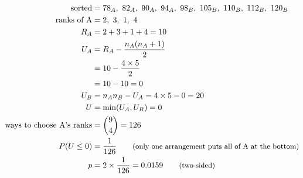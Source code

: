 \begin{align*}
\text{sorted} &= 78_{A},\ 82_{A},\ 90_{A},\ 94_{A},\ 98_{B},\ 105_{B},\ 110_{B},\ 112_{B},\ 120_{B} \\
\text{ranks of A} &= 2,\ 3,\ 1,\ 4 \\
R_A &= 2 + 3 + 1 + 4 = 10 \\
U_A &= R_A - \frac{n_A(n_A + 1)}{2} \\
 &= 10 - \frac{4 \times 5}{2} \\
 &= 10 - 10 = 0 \\
U_B &= n_A n_B - U_A = 4 \times 5 - 0 = 20 \\
U &= \min(U_A, U_B) = 0 \\
\text{ways to choose A's ranks} &= \binom{9}{4} = 126 \\
P(U \le 0) &= \frac{1}{126} \qquad \text{\small (only one arrangement puts all of A at the bottom)} \\
p &= 2 \times \frac{1}{126} = 0.0159 \qquad \text{\small (two-sided)}
\end{align*}
